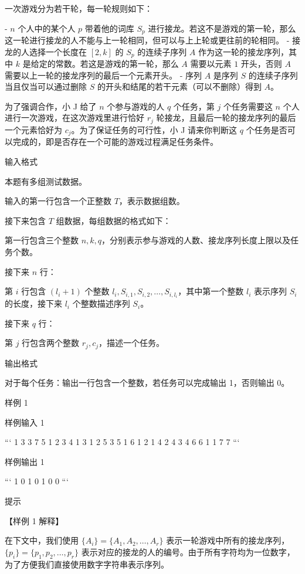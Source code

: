 \documentclass[12pt,twiside,a4paper]{ctexbook}
\numberwithin{chapter}{part}
\begin{document}
一次游戏分为若干轮，每一轮规则如下：

- $n$ 个人中的某个人 $p$ 带着他的词库 $S_p$ 进行接龙。若这不是游戏的第一轮，那么这一轮进行接龙的人不能与上一轮相同，但可以与上上轮或更往前的轮相同。
- 接龙的人选择一个长度在 $[2, k]$ 的 $S_p$ 的连续子序列 $A$ 作为这一轮的接龙序列，其中 $k$ 是给定的常数。若这是游戏的第一轮，那么 $A$ 需要以元素 $1$ 开头，否则 $A$ 需要以上一轮的接龙序列的最后一个元素开头。
  - 序列 $A$ 是序列 $S$ 的连续子序列当且仅当可以通过删除 $S$ 的开头和结尾的若干元素（可以不删除）得到 $A$。

为了强调合作，小 J 给了 $n$ 个参与游戏的人 $q$ 个任务，第 $j$ 个任务需要这 $n$ 个人进行一次游戏，在这次游戏里进行恰好 $r_j$ 轮接龙，且最后一轮的接龙序列的最后一个元素恰好为 $c_j$。为了保证任务的可行性，小 J 请来你判断这 $q$ 个任务是否可以完成的，即是否存在一个可能的游戏过程满足任务条件。

 输入格式

本题有多组测试数据。

输入的第一行包含一个正整数 $T$，表示数据组数。

接下来包含 $T$ 组数据，每组数据的格式如下：

第一行包含三个整数 $n, k, q$，分别表示参与游戏的人数、接龙序列长度上限以及任务个数。

接下来 $n$ 行：

第 $i$ 行包含 $(l_i + 1)$ 个整数 $l_i, S_{i,1}, S_{i,2}, \dots , S_{i,l_i}$，其中第一个整数 $l_i$ 表示序列 $S_i$ 的长度，接下来 $l_i$ 个整数描述序列 $S_i$。

接下来 $q$ 行：

第 $j$ 行包含两个整数 $r_j, c_j$，描述一个任务。

 输出格式

对于每个任务：输出一行包含一个整数，若任务可以完成输出 1，否则输出 0。

 样例 1

 样例输入 1

```
1
3 3 7
5 1 2 3 4 1
3 1 2 5
3 5 1 6
1 2
1 4
2 4
3 4
6 6
1 1
7 7
```

 样例输出 1

```
1
0
1
0
1
0
0
```

 提示

【样例 1 解释】

在下文中，我们使用 $\{A_i\} = \{A_1, A_2, \dots , A_r\}$ 表示一轮游戏中所有的接龙序列，$\{p_i\} = \{p_1, p_2, \dots , p_r\}$ 表示对应的接龙的人的编号。由于所有字符均为一位数字，为了方便我们直接使用数字字符串表示序列。
\end{document}
